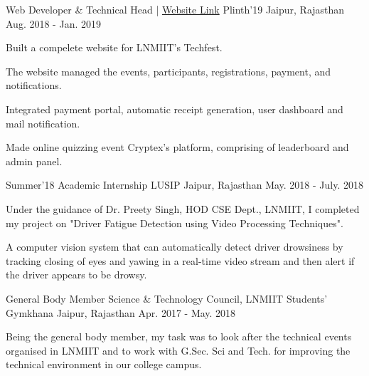 

\begin{cventries}

  \cventry
    {Web Developer \& Technical Head   |  {\href{https://plinth.in}{ Website Link}}}  %
    {Plinth'19} %
    {Jaipur, Rajasthan} %
    {Aug. 2018 - Jan. 2019} %
    {
      \begin{cvitems} %
        \item {Built a compelete website for LNMIIT's Techfest.}
        \item {The website managed the events, participants, registrations, payment, and notifications.}
        \item {Integrated payment portal, automatic receipt generation, user dashboard and mail notification.}
        \item {Made online quizzing event Cryptex's platform, comprising of leaderboard and admin panel.}
      \end{cvitems}
    }

  \cventry
    {Summer'18 Academic Internship} %
    {LUSIP} %
    {Jaipur, Rajasthan} %
    {May. 2018 - July. 2018} %
    {
      \begin{cvitems} %
        \item {Under the guidance of Dr. Preety Singh, HOD CSE Dept., LNMIIT, I completed my project on "Driver Fatigue Detection using Video Processing Techniques".}
        \item {A computer vision system that can automatically detect driver drowsiness by tracking closing of eyes and yawing in a real-time video stream and then alert if the driver appears to be drowsy.}
      \end{cvitems}
    }

  \cventry
    {General Body Member} %
    {Science \& Technology Council, LNMIIT Students' Gymkhana} %
    {Jaipur, Rajasthan} %
    {Apr. 2017 - May. 2018} %
    {
      \begin{cvitems} %
        \item {Being the general body member, my task was to look after the technical events organised in LNMIIT and to work with G.Sec. Sci and Tech. for improving the technical environment in our college campus.}
      \end{cvitems}
    }


\end{cventries}
